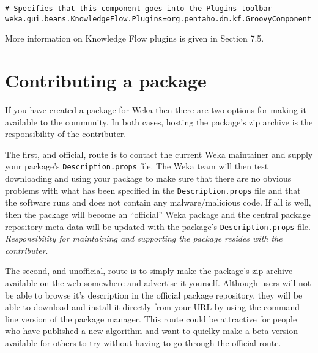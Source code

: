 \begin{verbatim}
# Specifies that this component goes into the Plugins toolbar
weka.gui.beans.KnowledgeFlow.Plugins=org.pentaho.dm.kf.GroovyComponent
\end{verbatim}

More information on Knowledge Flow plugins is given in Section 7.5.

\section{Contributing a package}

If you have created a package for Weka then there are two
options for making it available to the community. In both cases,
hosting the package's zip archive is the responsibility of
the contributer.

The first, and official, route is to contact the current Weka
maintainer and supply your package's \texttt{Description.props}
file. The Weka team will then test downloading and using your package
to make sure that there are no obvious problems with what has been
specified in the \texttt{Description.props} file and that the software
runs and does not contain any malware/malicious code. If all is well,
then the package will become an ``official'' Weka package and the
central package repository meta data will be updated with the
package's \texttt{Description.props} file. \textit{Responsibility for
maintaining and supporting the package resides with the contributer}.

The second, and unofficial, route is to simply make the package's zip
archive available on the web somewhere and advertise it
yourself. Although users will not be able to browse it's description
in the official package repository, they will be able to download and
install it directly from your URL by using the command line version of
the package manager. This route could be attractive for people who
have published a new algorithm and want to quiclky make a beta version
available for others to try without having to go through the official
route.

